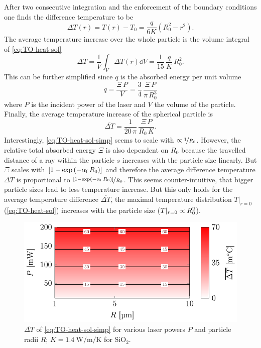 After two consecutive integration and the enforcement of the boundary 
conditions one finds the difference temperature to be
\begin{equation}
  \Delta T(r) = T(r) - T_{0} = \frac{q}{6K}\left( R_0^2 - r^{2} \right).
  \label{eq:TO-heat-sol}
\end{equation}
The average temperature increase over the whole particle is the volume integral 
of \cref{eq:TO-heat-sol}
\begin{equation}
  \overline{\Delta T} = \frac{1}{V}\int_{V}\Delta T(r) \dd{V} = 
  \frac{1}{15}\,\frac{q}{K}\,R^{2}_{0}.
  \label{eq:TO-heat-avg}
\end{equation}
This can be further simplified since $q$ is the absorbed energy per unit volume
\begin{equation}
  q = \frac{\Xi\,P}{V} = \frac{3}{4}\,\frac{\Xi\,P}{\pi\,R_{0}^{3}}
\end{equation}
where $P$ is the incident power of the laser and $V$ the volume of the 
particle. Finally, the average temperature increase of the spherical particle 
is
\begin{equation}
  \overline{\Delta T} = \frac{1}{20\,\pi}\,\frac{\Xi\,P}{R_{0}\,K}.
  \label{eq:TO-heat-sol-simp}
\end{equation}
Interestingly, \cref{eq:TO-heat-sol-simp} seems to scale with $\propto 
\nicefrac{1}{R_{0}}$. However, the relative total absorbed energy $\Xi$ is also 
dependent on $R_{0}$ because the travelled distance of a ray within the 
particle $s$ increases with the particle size linearly. But $\Xi$ scales with 
$\left[  1-\exp\left( -\alpha_{\mathrm{f}}\,R_{0} \right)\right]$ and therefore the 
average difference temperature $\overline{\Delta T}$ is proportional to 
$\nicefrac{\left[ 1-\exp\left( -\alpha_{\mathrm{f}}\,R_{0} \right) 
\right]}{R_{0}}$. This seems counter-intuitive, that bigger particle sizes lead 
to less temperature increase. But this only holds for the average temperature 
difference $\overline{\Delta T}$, the maximal temperature distribution 
$T\vert_{r=0}$ (\cref{eq:TO-heat-sol}) increases with the particle size 
($T\vert_{r=0}\propto R_{0}^{2}$).

\begin{figure}[tbp]
  \centering
  \includegraphics[]{External/dT.pdf}
  \caption{$\overline{\Delta T}$ of \cref{eq:TO-heat-sol-simp} for various 
  laser powers $P$ and particle radii $R$; 
$K=\SI{1.4}{\watt\per\meter\per\kelvin}$ for SiO$_{2}$.}
  \label{fig:TO-dT}
\end{figure}

